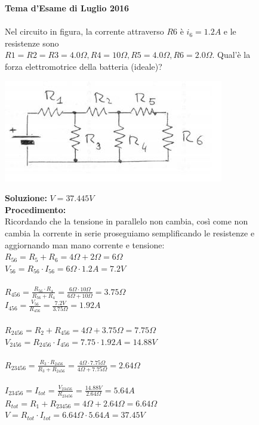 \begin{figure}[h!]
\textbf{Tema d'Esame di Luglio 2016}\\ \\
Nel circuito in figura, la corrente attraverso $R6$ è $i_6=1.2 A$ e le resistenze sono $R1=R2=R3=4.0 \Omega, R4= 10 \Omega, R5= 4.0 \Omega , R6= 2.0 \Omega$. Qual'è la forza elettromotrice della batteria (ideale)?
	\begin{center}
		\includegraphics[scale=0.8]{ES5/LUG052016.jpg}
	\end{center}
	\begin{boxed}
		\null\hfill \textbf{Soluzione:} $V = 37.445 V$\\
		\textbf{Procedimento: } \\
		Ricordando che la tensione in parallelo non cambia, così come non cambia la corrente in serie proseguiamo semplificando le resistenze e aggiornando man mano corrente e tensione:\\
		$R_{56}=R_5 + R_6=4\Omega + 2\Omega=6\Omega$\\
		$V_{56}=R_{56}\cdot I_{56}=6\Omega\cdot 1.2A=7.2V$\\\\
		$R_{456}=\frac{R_{56}\cdot R_4}{R_{56}+R_4}=\frac{6\Omega\cdot 10\Omega}{6\Omega + 10\Omega}=3.75\Omega$\\
		$I_{456}=\frac{V_{56}}{R_{456}}=\frac{7.2V}{3.75\Omega}=1.92A$\\ \\
		$R_{2456}=R_2+R_{456}=4\Omega+3.75\Omega=7.75\Omega$\\
		$V_{2456}=R_{2456}\cdot I_{456}=7.75\cdot 1.92A=14.88V$\\ \\
		$R_{23456}=\frac{R_3\cdot R_{2456}}{R_3+ R_{2456}}=\frac{4\Omega \cdot 7.75\Omega}{4\Omega+ 7.75\Omega}=2.64\Omega$\\ \\
		$I_{23456}=I_{tot}=\frac{V_{23456}}{R_{23456}}=\frac{14.88V}{2.64\Omega}=5.64A$\\
		$R_{tot}=R_1+R_{23456}=4\Omega+2.64\Omega=6.64\Omega$\\
		$V=R_{tot}\cdot I_{tot}=6.64\Omega \cdot 5.64A=37.45V$
	\end{boxed}
\end{figure}